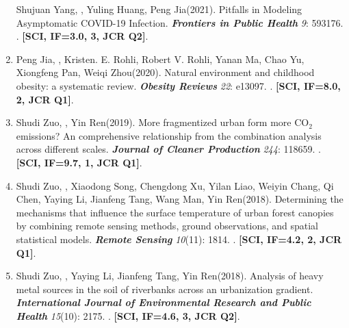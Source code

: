 \begin{enumerate}
    Shujuan Yang, \Shaoqing, Yuling Huang, Peng Jia\CS (2021).
    Pitfalls in Modeling Asymptomatic COVID-19 Infection.
    \textbf{\textit{Frontiers in Public Health}} \textit{9}: 593176.
    . 
    \textbf{[SCI, IF=3.0, 3, JCR Q2]}.
\item
    Peng Jia\CS, \Shaoqing, Kristen. E. Rohli, Robert V. Rohli, Yanan Ma, Chao Yu, Xiongfeng Pan, Weiqi Zhou\CS (2020).
    Natural environment and childhood obesity: a systematic review.
    \textbf{\textit{Obesity Reviews}} \textit{22}: e13097.
    . 
    \textbf{[SCI, IF=8.0, 2, JCR Q1]}.
\item
    Shudi Zuo, \Shaoqing, Yin Ren\CS (2019).
    More fragmentized urban form more CO$_2$ emissions? An comprehensive relationship from the combination analysis across different scales.
    \textbf{\textit{Journal of Cleaner Production}} \textit{244}: 118659.
    . 
    \textbf{[SCI, IF=9.7, 1, JCR Q1]}.
\item
    Shudi Zuo, \Shaoqing, Xiaodong Song, Chengdong Xu, Yilan Liao, Weiyin Chang, Qi Chen, Yaying Li, Jianfeng Tang, Wang Man, Yin Ren\CS (2018).
    Determining the mechanisms that influence the surface temperature of urban forest canopies by combining remote sensing methods, ground observations, and spatial statistical models. 
    \textbf{\textit{Remote Sensing}} \textit{10}(11): 1814.
    . 
    \textbf{[SCI, IF=4.2, 2, JCR Q1]}.
\item
    Shudi Zuo, \Shaoqing, Yaying Li, Jianfeng Tang, Yin Ren\CS (2018).
    Analysis of heavy metal sources in the soil of riverbanks across an urbanization gradient.
    \textbf{\textit{International Journal of Environmental Research and Public Health}} \textit{15}(10): 2175.
    . 
    \textbf{[SCI, IF=4.6, 3, JCR Q2]}.
\end{enumerate}

